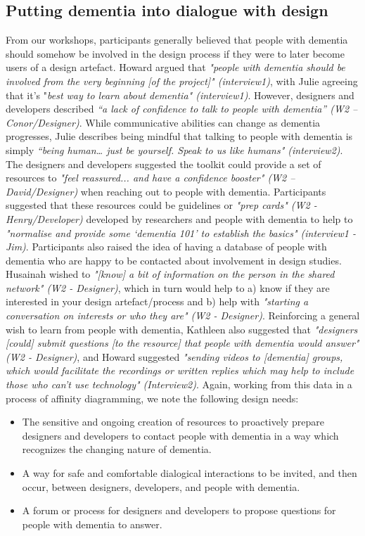 \subsection{Putting dementia into dialogue with design}
From our workshops, participants generally believed that people with dementia should somehow be involved in the design process if they were to later become users of a design artefact. Howard argued that \textit{"people with dementia should be involved from the very beginning [of the project]" (interview1)}, with Julie agreeing that it’s "\textit{best way to learn about dementia" (interview1)}. However, designers and developers described \textit{“a lack of confidence to talk to people with dementia” (W2 – Conor/Designer)}. While communicative abilities can change as dementia progresses, Julie describes being mindful that talking to people with dementia is simply \textit{“being human… just be yourself. Speak to us like humans" (interview2)}.
The designers and developers suggested the toolkit could provide a set of resources to \textit{"feel reassured... and have a confidence booster" (W2 – David/Designer)} when reaching out to people with dementia. Participants suggested that these resources could be guidelines or \textit{"prep cards" (W2 - Henry/Developer)} developed by researchers and people with dementia to help to \textit{"normalise and provide some ‘dementia 101’ to establish the basics" (interview1 - Jim)}. Participants also raised the idea of having a database of people with dementia who are happy to be contacted about involvement in design studies. Husainah wished to \textit{"[know] a bit of information on the person in the shared network" (W2 - Designer)}, which in turn would help to a) know if they are interested in your design artefact/process and b) help with \textit{"starting a conversation on interests or who they are" (W2 - Designer)}.
Reinforcing a general wish to learn from people with dementia, Kathleen also suggested that \textit{"designers [could] submit questions [to the resource] that people with dementia would answer" (W2 - Designer)}, and Howard suggested \textit{"sending videos to [dementia] groups, which would facilitate the recordings or written replies which may help to include those who can't use technology" (Interview2)}. Again, working from this data in a process of affinity diagramming, we note the following design needs:
\begin{itemize}
\item The sensitive and ongoing creation of resources to proactively prepare designers and developers to contact people with dementia in a way which recognizes the changing nature of dementia. 
\item A way for safe and comfortable dialogical interactions to be invited, and then occur, between designers, developers, and people with dementia.
\item A forum or process for designers and developers to propose questions for people with dementia to answer.
\end{itemize}

